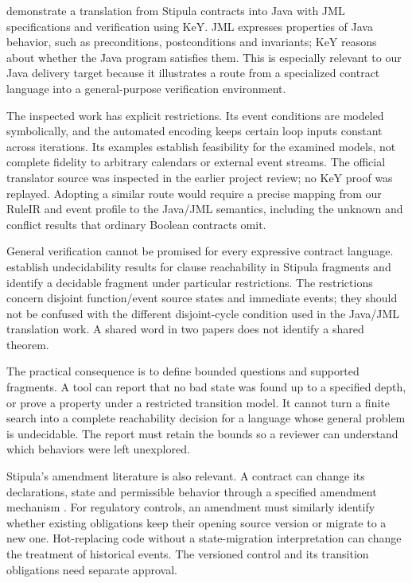 \citet{stipulakey2025} demonstrate a translation from Stipula contracts into
Java with JML specifications and verification using KeY. JML expresses properties
of Java behavior, such as preconditions, postconditions and invariants; KeY
reasons about whether the Java program satisfies them. This is especially
relevant to our Java delivery target because it illustrates a route from a
specialized contract language into a general-purpose verification environment.


The inspected work has explicit restrictions. Its event conditions are modeled
symbolically, and the automated encoding keeps certain loop inputs constant
across iterations. Its examples establish feasibility for the examined models,
not complete fidelity to arbitrary calendars or external event streams. The
official translator source was inspected in the earlier project review; no KeY
proof was replayed. Adopting a similar route would require a precise mapping
from our RuleIR and event profile to the Java/JML semantics, including the
unknown and conflict results that ordinary Boolean contracts omit.

General verification cannot be promised for every expressive contract language.
\citet{reachability2026} establish undecidability results for clause reachability
in Stipula fragments and identify a decidable fragment under particular
restrictions. The restrictions concern disjoint function/event source states
and immediate events; they should not be confused with the different
disjoint-cycle condition used in the Java/JML translation work. A shared word
in two papers does not identify a shared theorem.

The practical consequence is to define bounded questions and supported
fragments. A tool can report that no bad state was found up to a specified
depth, or prove a property under a restricted transition model. It cannot
turn a finite search into a complete reachability decision for a language
whose general problem is undecidable. The report must retain the bounds so a
reviewer can understand which behaviors were left unexplored.

Stipula's amendment literature is also relevant. A contract can change its
declarations, state and permissible behavior through a specified amendment
mechanism \citep[secs.~3--5]{amending2023}. For regulatory controls, an amendment
must similarly identify whether existing obligations keep their opening source
version or migrate to a new one. Hot-replacing code without a state-migration
interpretation can change the treatment of historical events. The versioned
control and its transition obligations need separate approval.

